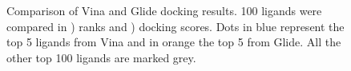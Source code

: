 \documentclass[11pt, letterpaper, titlepage]{article}
\begin{document}
\begin{figure}[htp]
	\centering
	\captionsetup[subfigure]{skip=-15pt,position=top,labelfont=bf,labelformat=parens,singlelinecheck=false}
	\caption{Comparison of Vina and Glide docking results. 100 ligands were compared in ) ranks and ) docking scores. Dots in blue represent the top 5 ligands from Vina and in orange the top 5 from Glide. All the other top 100 ligands are marked grey.}\label{fig:comp_glide_vina}
\end{figure}\\
\end{document}
